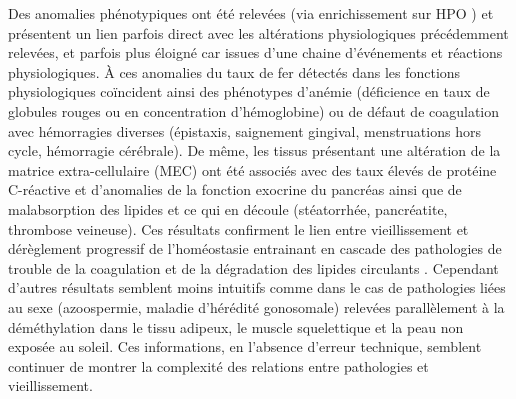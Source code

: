 Des anomalies phénotypiques ont été relevées (via enrichissement sur HPO ) et présentent un lien parfois direct avec les altérations physiologiques précédemment relevées, et parfois plus éloigné car issues d'une chaine d'événements et réactions physiologiques. 
À ces anomalies du taux de fer détectés dans les fonctions physiologiques coïncident ainsi des phénotypes d'anémie (déficience en taux de globules rouges ou en concentration d'hémoglobine) ou de défaut de coagulation avec hémorragies diverses (épistaxis, saignement gingival, menstruations hors cycle, hémorragie cérébrale). De même, les tissus présentant une altération de la matrice extra-cellulaire (MEC) ont été associés avec des taux élevés de protéine C-réactive et d'anomalies de la fonction exocrine du pancréas ainsi que de malabsorption des lipides et ce qui en découle (stéatorrhée, pancréatite, thrombose veineuse). Ces résultats confirment le lien entre vieillissement et dérèglement progressif de l'homéostasie entrainant en cascade des pathologies de trouble de la coagulation  et de la dégradation des lipides circulants . Cependant d'autres résultats semblent moins intuitifs comme dans le cas de pathologies liées au sexe (azoospermie, maladie d'hérédité gonosomale) relevées parallèlement à la déméthylation dans le tissu adipeux, le muscle squelettique et la peau non exposée au soleil. Ces informations, en l'absence d'erreur technique, semblent continuer de montrer la complexité des relations entre pathologies et vieillissement.

